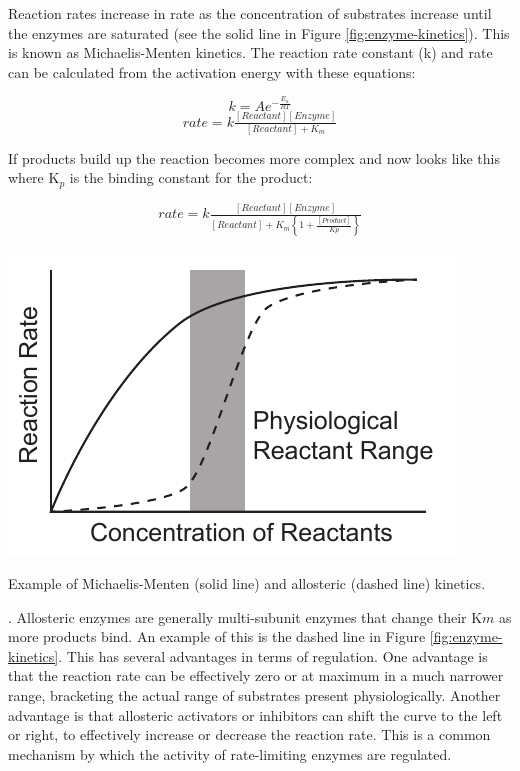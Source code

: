 \documentclass{tufte-handout}
\begin{document}
Reaction rates increase in rate as the concentration of substrates increase until the enzymes are saturated (see the solid line in Figure \ref{fig:enzyme-kinetics}).  This is known as Michaelis-Menten kinetics.  The reaction rate constant (k) and rate can be calculated from the activation energy with these equations:

\begin{equation}
k = A e^{-\frac{E_{a}}{RT}} 
\end{equation}
\begin{equation}
rate = k\tfrac{[Reactant][Enzyme]}{[Reactant] + K_{m}}
\end{equation}

If products build up the reaction becomes more complex and now looks like this where K$_{p}$ is the binding constant for the product:

\begin{equation}
rate = k\tfrac{[Reactant][Enzyme]}{[Reactant] +K_{m}\left \{ 1 + \frac{[Product]}{Kp} \right \}}
\end{equation}

\begin{marginfigure}
\includegraphics[width=\marginparwidth]{figures/enzyme-kinetics.pdf}\
\caption{Example of Michaelis-Menten (solid line) and allosteric (dashed line) kinetics.}
\label{fig:enzyme-kinetics}
\end{marginfigure}

.  Allosteric enzymes are generally multi-subunit enzymes that change their K${m}$ as more products bind.  An example of this is the dashed line in Figure \ref{fig:enzyme-kinetics}.  This has several advantages in terms of regulation.  One advantage is that the reaction rate can be effectively zero or at maximum in a much narrower range, bracketing the actual range of substrates present physiologically.  Another advantage is that allosteric activators or inhibitors can shift the curve to the left or right, to effectively increase or decrease the reaction rate.  This is a common mechanism by which the activity of rate-limiting enzymes are regulated.
\end{document}

